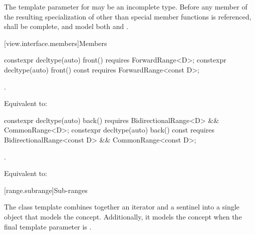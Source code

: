 \pnum
The template parameter  for  may be an
incomplete type. Before any member of the resulting specialization of
 other than special member functions
is referenced,  shall be complete, and
model both  and .

[view.interface.members]{Members}

%
\begin{itemdecl}
constexpr decltype(auto) front() requires ForwardRange<D>;
constexpr decltype(auto) front() const requires ForwardRange<const D>;
\end{itemdecl}

\begin{itemdescr}
\pnum
\expects {}.

\pnum
\effects Equivalent to: 
\end{itemdescr}

%
\begin{itemdecl}
constexpr decltype(auto) back() requires BidirectionalRange<D> && CommonRange<D>;
constexpr decltype(auto) back() const
  requires BidirectionalRange<const D> && CommonRange<const D>;
\end{itemdecl}

\begin{itemdescr}
\pnum
\expects {}.

\pnum
\effects Equivalent to: 
\end{itemdescr}

[range.subrange]{Sub-ranges}

\pnum
The  class template combines together an
iterator and a sentinel into a single object that models the
 concept. Additionally, it models the
 concept when the final template parameter is
.

